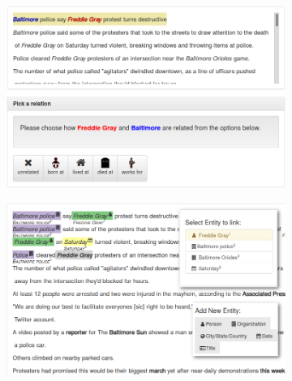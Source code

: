 \begin{figure}
  \centering

  \begin{subfigure}{0.49\textwidth}
  \centering
    \includegraphics[width=\textwidth]{figures/interface/relation-interface}
    \caption{\label{fig:relation-interface}}
  \end{subfigure}
  \hfill
  \begin{subfigure}{0.49\textwidth}
  \centering
    \includegraphics[width=\textwidth]{figures/interface/extraction-interface}
    \caption{\label{fig:entity-interface}}
  \end{subfigure} \\


\end{figure}

